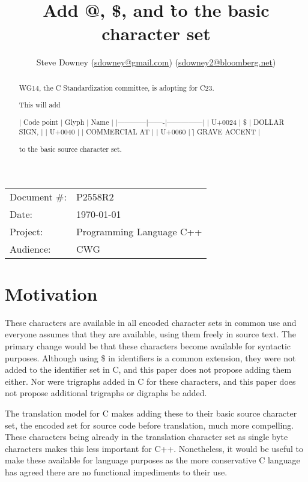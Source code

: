 \documentclass[a4paper,10pt,oneside,openany,final,article]{memoir}
\begin{document}
\title{Add @, \$, and \` to the basic character set}
\author{
  Steve Downey \small(\href{mailto:sdowney@gmail.com}{sdowney@gmail.com}) \small(\href{mailto:sdowney2@bloomberg.net}{sdowney2@bloomberg.net}) \\
}
\date{} %
\maketitle

\begin{flushright}
\begin{tabular}{ll}
Document \#: & P2558R2 \\
Date: & \today \\
Project: & Programming Language C++ \\
Audience: & CWG
\end{tabular}
\end{flushright}

\begin{abstract}
  WG14, the C Standardization committee, is adopting \cite{@CN2701} for C23.

  This will add

  | Code point | Glyph | Name          |
  |------------|-------|---------------|
  | U+0024     | \$     | DOLLAR SIGN,  |
  | U+0040     | \@     | COMMERCIAL AT |
  | U+0060     | \`     | GRAVE ACCENT  |


  to the basic source character set.

\end{abstract}

\tableofcontents*

\chapter{Motivation}
  These characters are available in all encoded character sets in common use and everyone assumes that they are available, using them freely in source text. The primary change would be that these characters become available for syntactic purposes. Although using \$ in identifiers is a common extension, they were not added to the identifier set in C, and this paper does not propose adding them either. Nor were trigraphs added in C for these characters, and this paper does not propose additional trigraphs or digraphs be added.

  The translation model for C makes adding these to their basic source character set, the encoded set for source code before translation, much more compelling. These characters being already in the translation character set as single byte characters makes this less important for C++. Nonetheless, it would be useful to make these available for language purposes as the more conservative C language has agreed there are no functional impediments to their use.
\end{document}
